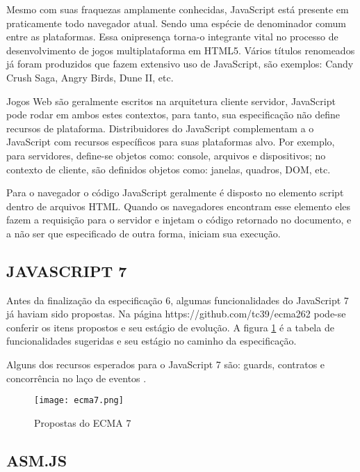 Mesmo com suas fraquezas amplamente conhecidas, JavaScript está
presente em praticamente todo navegador atual. Sendo uma espécie de
denominador comum entre as plataformas. Essa onipresença torna-o
integrante vital no processo de desenvolvimento de jogos multiplataforma
em HTML5. Vários títulos renomeados já foram produzidos que fazem
extensivo uso de JavaScript, são exemplos: Candy Crush Saga, Angry
Birds, Dune II, etc.

Jogos Web são geralmente escritos na arquitetura cliente servidor,
JavaScript pode rodar em ambos estes contextos, para tanto, sua
especificação não define recursos de plataforma. Distribuidores do
JavaScript complementam a o JavaScript com recursos específicos para
suas plataformas alvo. Por exemplo, para servidores, define-se objetos como:
console, arquivos e dispositivos; no contexto de cliente,
são definidos objetos como: janelas, quadros, DOM, etc.

Para o navegador o código JavaScript geralmente é disposto no elemento
script dentro de arquivos HTML. Quando os navegadores encontram esse
elemento eles fazem a requisição para o servidor e injetam o código
retornado no documento, e a não ser que especificado de outra forma,
iniciam sua execução.

\subsection{JAVASCRIPT 7}

Antes da finalização da especificação 6, algumas funcionalidades
do JavaScript 7 já haviam sido propostas. Na página
https://github.com/tc39/ecma262 pode-se conferir os itens propostos e
seu estágio de evolução. A figura \ref{fig:ecma7} é a tabela de
funcionalidades sugeridas e seu estágio no caminho da especificação.

Alguns dos recursos esperados para o JavaScript 7 são: guards,
contratos e concorrência no laço de eventos \autocite{ecma7}.

\begin{figure}[H]
    \centering
    \texttt{[image: ecma7.png]}
	\caption{Propostas do ECMA 7}
    \label{fig:ecma7}
\end{figure}

\subsection{ASM.JS}%

